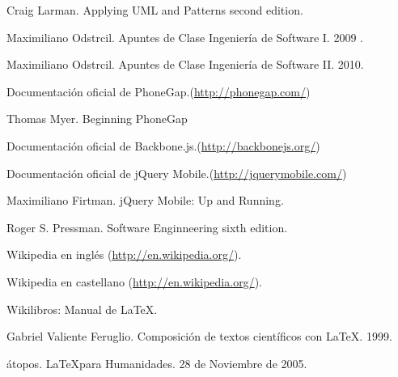 \begin{thebibliography}{99}

 Craig Larman. Applying UML and Patterns second edition.

 Maximiliano Odstrcil. Apuntes de Clase Ingeniería de Software I. 2009 .

 Maximiliano Odstrcil. Apuntes de Clase Ingeniería de Software II. 2010.

 Documentación oficial de PhoneGap.(\href{http://phonegap.com/}{http://phonegap.com/})

 Thomas Myer. Beginning PhoneGap

 Documentación oficial de Backbone.js.(\href{http://backbonejs.org/}{http://backbonejs.org/})

 Documentación oficial de jQuery Mobile.(\href{http://jquerymobile.com/}{http://jquerymobile.com/})

 Maximiliano Firtman. jQuery Mobile: Up and Running.

 Roger S. Pressman. Software Enginneering sixth edition.

 Wikipedia en inglés (\href{http://en.wikipedia.org/}{http://en.wikipedia.org/}).

 Wikipedia en castellano (\href{http://es.wikipedia.org/}{http://en.wikipedia.org/}).

 Wikilibros: Manual de \LaTeX.

 Gabriel Valiente Feruglio. Composición de textos científicos con \LaTeX. 1999.

 átopos. \LaTeX para Humanidades. 28 de Noviembre de 2005.

\end{thebibliography}
